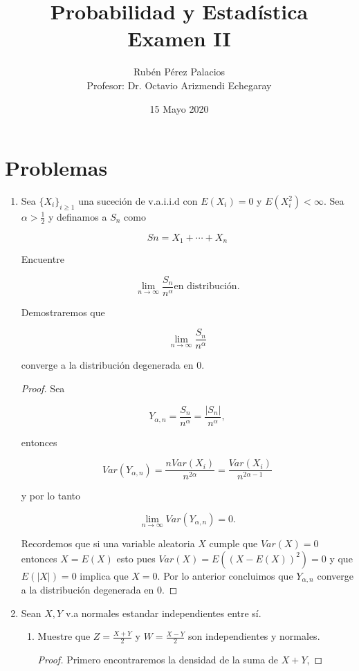 \documentclass[letterpaper]{article}
\title{Probabilidad y Estadística\\Examen II}
\author{Rubén Pérez Palacios\\Profesor: Dr. Octavio Arizmendi Echegaray}
\date{15 Mayo 2020}
\theoremstyle{definition}
\theoremstyle{lemathm}
\theoremstyle{lemademthm}
\newcommand{\limninf}{\lim_{n\to\infty}}
\begin{document}
	\maketitle
    
    \section*{Problemas}

    \begin{enumerate}
        
        \item Sea $\{X_i\}_{i\geq1}$ una suceción de v.a.i.i.d con $E(X_i) = 0$ y $E(X_i^2) < \infty$. Sea $\alpha > \frac{1}{2}$ y definamos a $S_n$ como
		
		\[Sn = X_1 + \cdots + X_n\]

		Encuentre

		\[\limninf \frac{S_n}{n^\alpha} \text{en distribución}.\]

		Demostraremos que

		\[\limninf \frac{S_n}{n^\alpha}\]

		converge a la distribución degenerada en 0.

		\begin{proof}
			Sea 

			\[Y_{\alpha,n} = \frac{S_n}{n^\alpha} = \frac{|S_n|}{n^\alpha},\]
			
			entonces

			\[Var(Y_{\alpha,n}) = \frac{nVar(X_i)}{n^{2\alpha}} = \frac{Var(X_i)}{n^{2\alpha - 1}}\]

			y por lo tanto

			\[\limninf Var(Y_{\alpha,n}) = 0.\]

			Recordemos que si una variable aleatoria $X$ cumple que $Var(X) = 0$ entonces $X = E(X)$ esto pues $Var(X) = E((X - E(X))^2) = 0$ y que $E(|X|) = 0$ implica que $X=0$. Por lo anterior concluimos que $Y_{\alpha,n}$ converge a la distribución degenerada en 0.			
		\end{proof}

		\item Sean $X, Y$ v.a normales estandar independientes entre sí.
		
		\begin{enumerate}
			\item Muestre que $Z = \frac{X + Y}{2}$ y $W = \frac{X - Y}{2}$ son independientes y normales.
			
			\begin{proof}
				Primero encontraremos la densidad de la suma de $X+Y$,


\end{proof}
\end{enumerate}
\end{enumerate}
\end{document}
